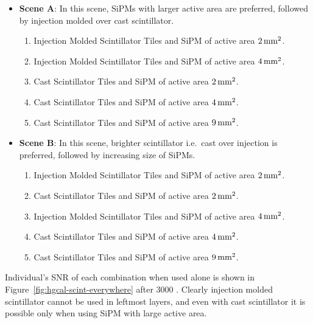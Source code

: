 \begin{itemize}
  \item \textbf{Scene A}: In this scene, \glspl{SiPM} with larger active area
        are preferred, followed by injection molded over cast scintillator.
        \begin{enumerate}
          \item Injection Molded Scintillator Tiles and SiPM of active area \( 2\,\text{mm}{}^2 \).
          \item Injection Molded Scintillator Tiles and SiPM of active area \( 4\,\text{mm}{}^2 \).
          \item Cast Scintillator Tiles and SiPM of active area \( 2\,\text{mm}{}^2 \).
          \item Cast Scintillator Tiles and SiPM of active area \( 4\,\text{mm}{}^2 \).
          \item Cast Scintillator Tiles and SiPM of active area \( 9\,\text{mm}{}^2 \).
        \end{enumerate}
  \item \textbf{Scene B}: In this scene, brighter scintillator
        i.e.~cast over injection is preferred, followed by
        increasing size of \glspl{SiPM}.
        \begin{enumerate}
          \item Injection Molded Scintillator Tiles and SiPM of active area \( 2\,\text{mm}{}^2 \).
          \item Cast Scintillator Tiles and SiPM of active area \( 2\,\text{mm}{}^2 \).
          \item Injection Molded Scintillator Tiles and SiPM of active area \( 4\,\text{mm}{}^2 \).
          \item Cast Scintillator Tiles and SiPM of active area \( 4\,\text{mm}{}^2 \).
          \item Cast Scintillator Tiles and SiPM of active area \( 9\,\text{mm}{}^2 \).
        \end{enumerate}
\end{itemize}

Individual's \gls{SNR} of each combination when used alone is shown in
Figure~\ref{fig:hgcal-scint-everywhere} after 3000 \fbinv{}.
Clearly injection molded scintillator cannot be used in leftmost layers,
and even with cast scintillator it is possible only when using
\gls{SiPM} with large active area.

